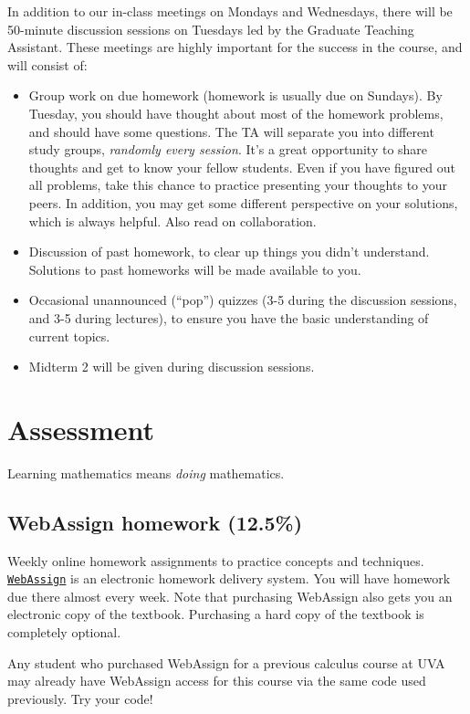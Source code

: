 \documentclass[oneside,11pt]{amsart}
\begin{document}
In addition to our in-class meetings on Mondays and Wednesdays, there will be 50-minute discussion sessions on Tuesdays led by the Graduate Teaching Assistant. These meetings are highly important for the success in the course, and will consist of:
\begin{itemize}
	\item 
		Group work on due homework (homework is usually due on Sundays). By Tuesday, you should have thought about most of the homework problems, and should have some questions. The TA will separate you into different study groups, \emph{randomly every session}. It's a great opportunity to share thoughts and get to know your fellow students. Even if you have figured out all problems, take this chance to practice presenting your thoughts to your peers. In addition, you may get some different perspective on your solutions, which is always helpful. Also read  on collaboration.
	\item 
	Discussion of past homework, to clear up things you didn't understand. Solutions to past homeworks will be made available to you.
	\item Occasional unannounced (``pop'') quizzes (3-5 during the discussion sessions, and 3-5 during lectures), to ensure you have the basic understanding of current topics.
	\item Midterm 2 will be given during discussion sessions.
\end{itemize}

\section{Assessment}

Learning mathematics means \emph{doing} mathematics. 

\subsection{WebAssign homework (12.5\%)} Weekly online homework assignments to practice concepts and techniques.
\href{https://www.webassign.net/}{\textcolor{green!70!black}{\texttt{WebAssign}}} is an electronic homework delivery system. You will have homework due there almost every week. Note that purchasing WebAssign also gets you an electronic copy of the textbook. Purchasing a hard copy of the textbook is completely optional.

Any student who purchased WebAssign for a previous calculus course at UVA may already have WebAssign access for this course via the same code used previously. Try your code!
\end{document}

